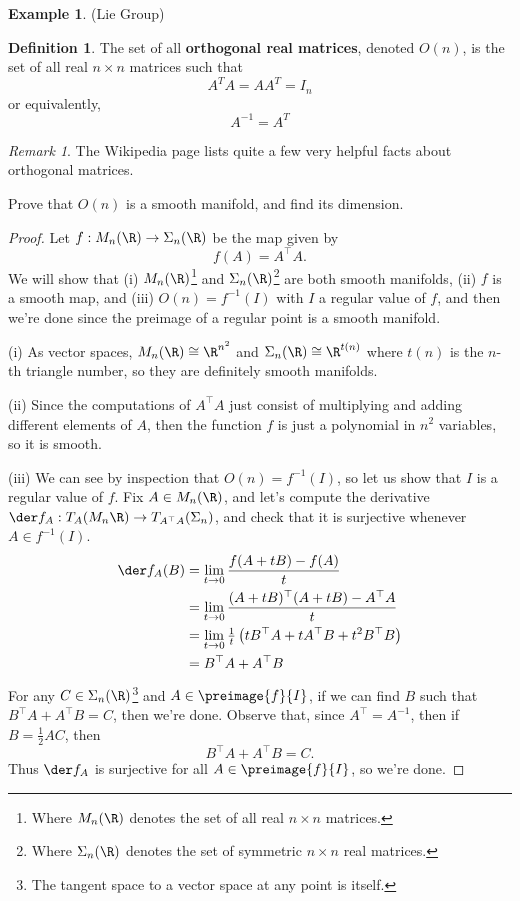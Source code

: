 \documentclass[a5paper]{article}
\theoremstyle{definition}%
\newtheorem*{definition*}{Definition}
\newtheorem*{example*}{Example}
\numberwithin{exercise}{section}
\theoremstyle{remark}%
\newtheorem*{remark*}{Remark}
\renewcommand{\emph}{\textbf}
\begin{document}
\begin{example*}(Lie Group)

\begin{highlight}
\begin{definition*}
The set of all \emph{orthogonal real matrices}, denoted $O(n)$, is the set of all real $n\times n$ matrices such that 
$$A^TA=AA^T=I_n$$
or equivalently, 
$$A^{-1}=A^T$$
\end{definition*}
\end{highlight}
\begin{remark*}
The Wikipedia page lists quite a few very helpful facts about orthogonal matrices. 
\end{remark*}
\pagebreak
Prove that $O(n)$ is a smooth manifold, and find its dimension. 

\begin{proof}
Let $f:M_n(\R)\to \Sigma_n(\R)$ be the map given by 
$$f(A)=A^\top A.$$
	We will show that (i) $M_n(\R)$\footnote{Where $M_n(\R)$ denotes the set of all real $n\times n$ matrices.} and $\Sigma_n(\R)$\footnote{Where $\Sigma_n(\R)$ denotes the set of symmetric $n\times n$ real matrices.} are both smooth manifolds, (ii) $f$ is a smooth map, and (iii) $O(n)=f^{-1}(I)$ with $I$ a regular value of $f$, and then we're done since the preimage of a regular point is a smooth manifold.

(i) As vector spaces, $M_n(\R)\cong \R^{n^2}$ and $\Sigma_n(\R)\cong\R^{t(n)}$ where $t(n)$ is the $n$-th triangle number, so they are definitely smooth manifolds. 

(ii) Since the computations of $A^\top A$ just consist of multiplying and adding different elements of $A$, then the function $f$ is just a polynomial in $n^2$ variables, so it is smooth. 

(iii) We can see by inspection that $O(n)=f^{-1}(I)$, so let us show that $I$ is a regular value of $f$. Fix $A\in M_n(\R)$, and let's compute the derivative $\der f_A:T_A(M_n\R)\to T_{A^\top A}(\Sigma_n)$, and check that it is surjective whenever $A\in f^{-1}(I)$. 
\begin{align*}
\der f_A(B)&= \lim_{t\to0}\frac{f(A+tB)-f(A)}{t} \\
&= \lim_{t\to0}\frac{(A+tB)^\top (A+tB)-A^\top A}{t}\\
&= \lim_{t\to0}\tfrac{1}{t}\left(tB^\top A+tA^\top B+t^2B^\top B\right)\\
&= B^\top A+A^\top B
\end{align*}
For any $C\in \Sigma_n(\R)$\footnote{The tangent space to a vector space at any point is itself.} and $A\in\preimage{f}{I}$, if we can find $B$ such that $B^\top A+A^\top B=C$, then we're done. Observe that, since $A^\top =A^{-1}$, then if $B=\frac{1}{2}AC$, then 
$$B^\top A+A^\top B=C.$$
Thus $\der f_A$ is surjective for all $A\in\preimage{f}{I}$, so we're done.
\end{proof}


\end{example*}
\end{document}
